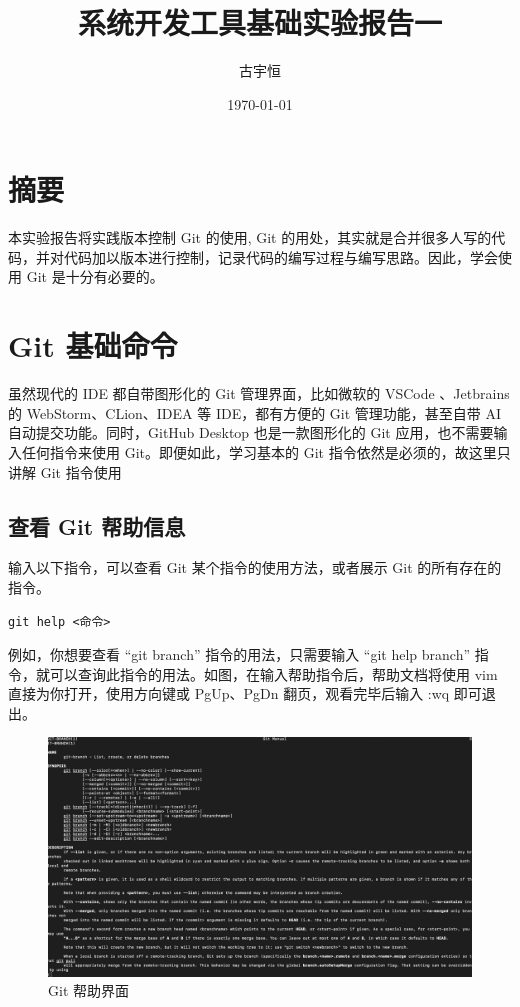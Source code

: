 \documentclass[UTF8]{gyh}
\title{系统开发工具基础实验报告一}
\author{古宇恒}
\date{\today}
\begin{document}
\fancyfoot[C]{\thepage}

\maketitle
\tableofcontents
\newpage

\section{摘要}
本实验报告将实践版本控制 Git 的使用, Git 的用处，其实就是合并很多人写的代码，并对代码加以版本进行控制，记录代码的编写过程与编写思路。因此，学会使用 Git 是十分有必要的。

\section{Git 基础命令}

虽然现代的 IDE 都自带图形化的 Git 管理界面，比如微软的 VSCode 、Jetbrains 的 WebStorm、CLion、IDEA 等 IDE，都有方便的 Git 管理功能，甚至自带 AI 自动提交功能。同时，GitHub Desktop 也是一款图形化的 Git 应用，也不需要输入任何指令来使用 Git。即便如此，学习基本的 Git 指令依然是必须的，故这里只讲解 Git 指令使用

\subsection{查看 Git 帮助信息}
输入以下指令，可以查看 Git 某个指令的使用方法，或者展示 Git 的所有存在的指令。
\begin{lstlisting}
git help <命令>
\end{lstlisting}
例如，你想要查看 “git branch” 指令的用法，只需要输入 “git help branch” 指令，就可以查询此指令的用法。如图，在输入帮助指令后，帮助文档将使用 vim 直接为你打开，使用方向键或 PgUp、PgDn 翻页，观看完毕后输入 :wq 即可退出。
\begin{figure}[H]
\centering
\includegraphics[scale=0.18]{img/img1.png}
\caption{Git 帮助界面}
\end{figure}
\end{document}

